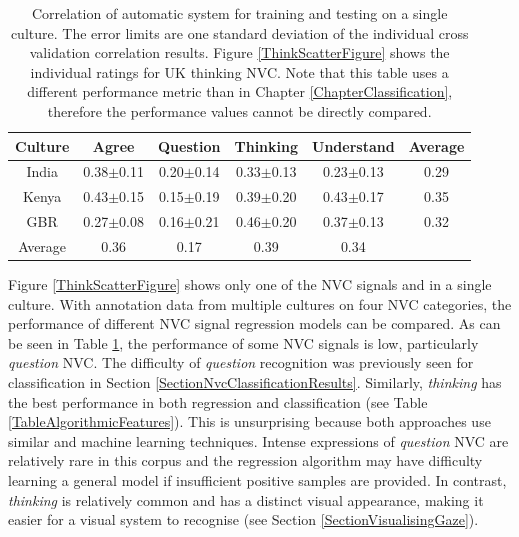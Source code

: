 \begin{table}
\centering
\caption[Correlation of automatic system for training and testing on a single culture.]{Correlation of automatic system for training and testing on a single culture. The error limits are one standard deviation of the individual cross validation correlation results. Figure \ref{ThinkScatterFigure} shows the individual ratings for \ac{UK} thinking \ac{NVC}. Note that this table uses a different performance metric than in Chapter \ref{ChapterClassification}, therefore the performance values cannot be directly compared.}
\begin{tabular}{|c| c c c c | c |}
\hline
Culture & Agree & Question & Thinking & Understand & Average\\
\hline
\hline
India & 0.38$\pm$0.11 & 0.20$\pm$0.14 & 0.33$\pm$0.13 & 0.23$\pm$0.13 & 0.29\\
Kenya & 0.43$\pm$0.15 & 0.15$\pm$0.19 & 0.39$\pm$0.20 & 0.43$\pm$0.17 & 0.35\\
GBR & 0.27$\pm$0.08 & 0.16$\pm$0.21 & 0.46$\pm$0.20 & 0.37$\pm$0.13 & 0.32\\
\hline
Average & 0.36 & 0.17 & 0.39 & 0.34 & \\
\hline
\end{tabular}
\label{CultureCorrelationTable}
\end{table}


Figure \ref{ThinkScatterFigure} shows only one of the \ac{NVC} signals and in a single culture. With annotation data from multiple cultures on four \ac{NVC} categories, the performance of different \ac{NVC} signal regression models can be compared. As can be seen in Table \ref{CultureCorrelationTable}, the performance of some \ac{NVC} signals is low, particularly \textit{question} \ac{NVC}. The difficulty of \textit{question} recognition was previously seen for classification in Section \ref{SectionNvcClassificationResults}. Similarly, \textit{thinking} has the best performance in both regression and classification (see Table \ref{TableAlgorithmicFeatures}). This is unsurprising because both approaches use similar \featureGeneration and machine learning techniques. 
Intense expressions of \textit{question} \ac{NVC} are relatively rare in this corpus and the regression algorithm may have difficulty learning a general model if insufficient positive samples are provided. In contrast, \textit{thinking} is relatively common and has a distinct visual appearance, making it easier for a visual system to recognise (see Section \ref{SectionVisualisingGaze}).

